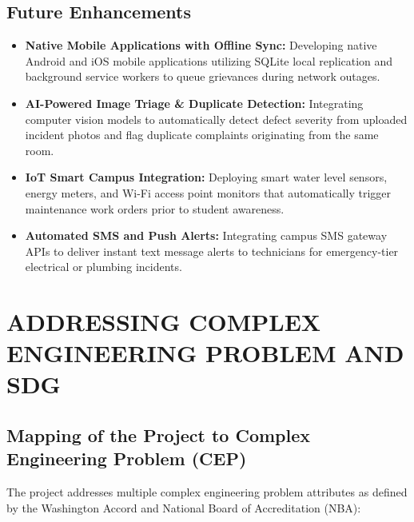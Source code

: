 \documentclass[10pt]{report}
\begin{document}
\section{Future Enhancements}
\begin{itemize}
\item \textbf{Native Mobile Applications with Offline Sync:} Developing native Android and iOS mobile applications utilizing SQLite local replication and background service workers to queue grievances during network outages.
\item \textbf{AI-Powered Image Triage \& Duplicate Detection:} Integrating computer vision models to automatically detect defect severity from uploaded incident photos and flag duplicate complaints originating from the same room.
\item \textbf{IoT Smart Campus Integration:} Deploying smart water level sensors, energy meters, and Wi-Fi access point monitors that automatically trigger maintenance work orders prior to student awareness.
\item \textbf{Automated SMS and Push Alerts:} Integrating campus SMS gateway APIs to deliver instant text message alerts to technicians for emergency-tier electrical or plumbing incidents.
\end{itemize}

\chapter{ADDRESSING COMPLEX ENGINEERING PROBLEM AND SDG}
\linespread{1.5}

\section{Mapping of the Project to Complex Engineering Problem (CEP)}
\hspace{0.5cm}The project addresses multiple complex engineering problem attributes as defined by the Washington Accord and National Board of Accreditation (NBA):
\end{document}
